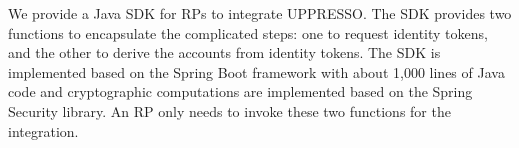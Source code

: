 


We provide a Java SDK for RPs to integrate UPPRESSO.
The SDK provides two functions to encapsulate the complicated steps:
 one to request identity tokens,
    and the other to derive the accounts from identity tokens.
The SDK is implemented based on the Spring Boot framework  with about 1,000 lines of Java code
 and cryptographic computations are implemented based on the Spring Security library.
An RP only needs to invoke these two functions for the integration.


